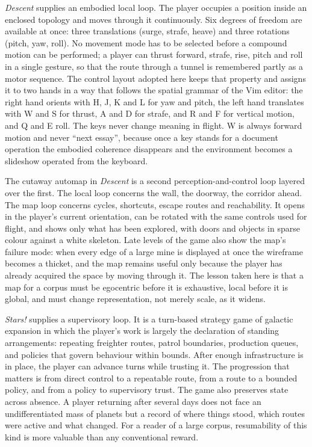 \documentclass[11pt]{article}
\theoremstyle{remark}
\begin{document}
\emph{Descent} supplies an embodied local loop. The player occupies a position inside an enclosed topology and moves through it continuously. Six degrees of freedom are available at once: three translations (surge, strafe, heave) and three rotations (pitch, yaw, roll). No movement mode has to be selected before a compound motion can be performed; a player can thrust forward, strafe, rise, pitch and roll in a single gesture, so that the route through a tunnel is remembered partly as a motor sequence. The control layout adopted here keeps that property and assigns it to two hands in a way that follows the spatial grammar of the Vim editor: the right hand orients with H, J, K and L for yaw and pitch, the left hand translates with W and S for thrust, A and D for strafe, and R and F for vertical motion, and Q and E roll. The keys never change meaning in flight. W is always forward motion and never ``next essay'', because once a key stands for a document operation the embodied coherence disappears and the environment becomes a slideshow operated from the keyboard.

The cutaway automap in \emph{Descent} is a second perception-and-control loop layered over the first. The local loop concerns the wall, the doorway, the corridor ahead. The map loop concerns cycles, shortcuts, escape routes and reachability. It opens in the player's current orientation, can be rotated with the same controls used for flight, and shows only what has been explored, with doors and objects in sparse colour against a white skeleton. Late levels of the game also show the map's failure mode: when every edge of a large mine is displayed at once the wireframe becomes a thicket, and the map remains useful only because the player has already acquired the space by moving through it. The lesson taken here is that a map for a corpus must be egocentric before it is exhaustive, local before it is global, and must change representation, not merely scale, as it widens.

\emph{Stars!} supplies a supervisory loop. It is a turn-based strategy game of galactic expansion in which the player's work is largely the declaration of standing arrangements: repeating freighter routes, patrol boundaries, production queues, and policies that govern behaviour within bounds. After enough infrastructure is in place, the player can advance turns while trusting it. The progression that matters is from direct control to a repeatable route, from a route to a bounded policy, and from a policy to supervisory trust. The game also preserves state across absence. A player returning after several days does not face an undifferentiated mass of planets but a record of where things stood, which routes were active and what changed. For a reader of a large corpus, resumability of this kind is more valuable than any conventional reward.
\end{document}
